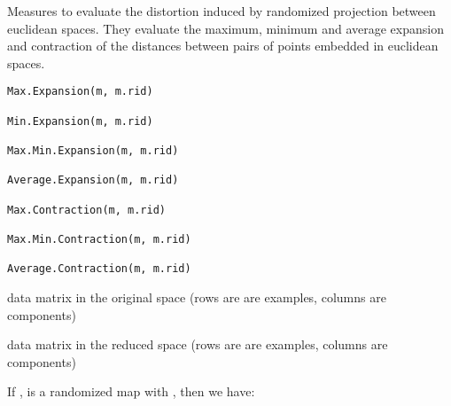 \documentclass{article}
\begin{document}
\begin{Description}\relax
Measures to evaluate the  distortion induced by randomized projection between euclidean spaces.
They evaluate the maximum, minimum and average expansion and contraction of the distances between pairs of points
embedded in euclidean spaces.
\end{Description}
\begin{Usage}
\begin{verbatim}
Max.Expansion(m, m.rid)

Min.Expansion(m, m.rid)

Max.Min.Expansion(m, m.rid)

Average.Expansion(m, m.rid)

Max.Contraction(m, m.rid)

Max.Min.Contraction(m, m.rid)

Average.Contraction(m, m.rid)
\end{verbatim}
\end{Usage}
\begin{Arguments}
\begin{ldescription}
\item[\code{m}] data matrix in the original space (rows are are examples, columns are components) 
\item[\code{m.rid}] data matrix in the reduced space (rows are are examples, columns are components) 
\end{ldescription}
\end{Arguments}
\begin{Details}\relax
If , 
 is a randomized map with ,
then we have:
\end{Details}
\end{document}

